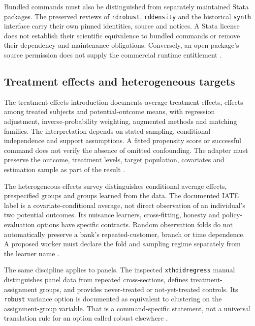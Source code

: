 Bundled commands must also be distinguished from separately maintained
Stata packages. The preserved reviews of \texttt{rdrobust},
\texttt{rddensity} and the historical \texttt{synth} interface carry their
own pinned identities, source and notices. A Stata license does not
establish their scientific equivalence to bundled commands or remove their
dependency and maintenance obligations. Conversely, an open package's
source permission does not supply the commercial runtime entitlement
\cite{exec13_ivrd_rdrobust,exec13_ivrd_rddensity,exec19_synth_stata_source,
exec24_stata_choice}.

\subsection{Treatment effects and heterogeneous targets}
The treatment-effects introduction documents average treatment effects,
effects among treated subjects and potential-outcome means, with regression
adjustment, inverse-probability weighting, augmented methods and matching
families. The interpretation depends on stated sampling, conditional
independence and support assumptions. A fitted propensity score or
successful command does not verify the absence of omitted confounding.
The adapter must preserve the outcome, treatment levels, target population,
covariates and estimation sample as part of the result
\cite{exec13_ci_stata_causal_intro}.

The heterogeneous-effects survey distinguishes conditional average effects,
prespecified groups and groups learned from the data. The documented IATE
label is a covariate-conditional average, not direct observation of an
individual's two potential outcomes. Its nuisance learners, cross-fitting,
honesty and policy-evaluation options have specific contracts. Random
observation folds do not automatically preserve a bank's repeated-customer,
branch or time dependence. A proposed worker must declare the fold and
sampling regime separately from the learner name
\cite{exec13_ch_stata,exec24_stata_choice}.

The same discipline applies to panels. The inspected
\texttt{xthdidregress} manual distinguishes panel data from repeated
cross-sections, defines treatment-assignment groups, and provides
never-treated or not-yet-treated controls. Its \texttt{robust} variance
option is documented as equivalent to clustering on the assignment-group
variable. That is a command-specific statement, not a universal translation
rule for an option called robust elsewhere
\cite{exec18_gp_stata_xthdid}.

